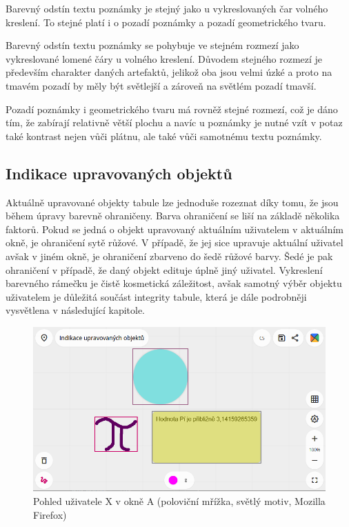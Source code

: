 Barevný odstín textu poznámky je stejný jako u vykreslovaných čar volného kreslení.
To stejné platí i o pozadí poznámky a pozadí geometrického tvaru.

Barevný odstín textu poznámky se pohybuje ve stejném rozmezí jako vykreslované lomené čáry u volného kreslení.
Důvodem stejného rozmezí je především charakter daných artefaktů, jelikož oba jsou velmi úzké a proto na tmavém pozadí by měly být světlejší a zároveň na světlém pozadí tmavší.

Pozadí poznámky i geometrického tvaru má rovněž stejné rozmezí, což je dáno tím, že zabírají relativně větší plochu a navíc u poznámky je nutné vzít v potaz také kontrast nejen vůči plátnu, ale také vůči samotnému textu poznámky.




\subsection{Indikace upravovaných objektů}
Aktuálně upravované objekty tabule lze jednoduše rozeznat díky tomu, že jsou během úpravy barevně ohraničeny.
Barva ohraničení se liší na základě několika faktorů.
Pokud se jedná o objekt upravovaný aktuálním uživatelem v aktuálním okně, je ohraničení sytě růžové.
V případě, že jej sice upravuje aktuální uživatel avšak v jiném okně, je ohraničení zbarveno do šedě růžové barvy.
Šedé je pak ohraničení v případě, že daný objekt edituje úplně jiný uživatel.
Vykreslení barevného rámečku je čistě kosmetická záležitost, avšak samotný výběr objektu uživatelem je důležitá součást integrity tabule, která je dále podrobněji vysvětlena v následující kapitole.

\begin{figure}[h!]
	\centering
	\includegraphics[width=1\textwidth]{Figures/ObjectIndication1.png}
	\caption{Pohled uživatele X v okně A (poloviční mřížka, světlý motiv, Mozilla Firefox)}
	\label{fig:ObjectIndication1}
\end{figure}

